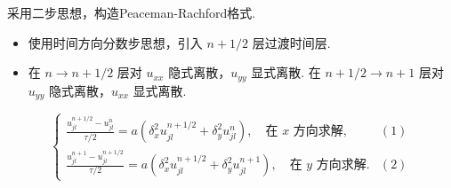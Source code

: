 采用二步思想，构造Peaceman-Rachford格式.

\begin{itemize}
    \item 使用时间方向分数步思想，引入 $n + 1/2$ 层过渡时间层.
    \item 在 $n \rightarrow n + 1/2$ 层对 $u_{xx}$ 隐式离散，$u_{yy}$ 显式离散. 在 $n + 1/2 \rightarrow n + 1$ 层对 $u_{yy}$ 隐式离散，$u_{xx}$ 显式离散.
\end{itemize}

\begin{equation}\label{eq:7.1-7.2}
    \begin{cases}
        \frac{u_{jl}^{n+1/2} - u_{jl}^n}{\tau/2} = a\left(\delta_x^2 u_{jl}^{n+1/2} + \delta_y^2 u_{jl}^n\right), \quad \text{在 } x \text{ 方向求解}, &(1)\\[7pt]
        \frac{u_{jl}^{n+1} - u_{jl}^{n+1/2}}{\tau/2} = a\left(\delta_x^2 u_{jl}^{n+1/2} + \delta_y^2 u_{jl}^{n+1}\right), \quad \text{在 } y \text{ 方向求解}. &(2) 
    \end{cases}
\end{equation}


